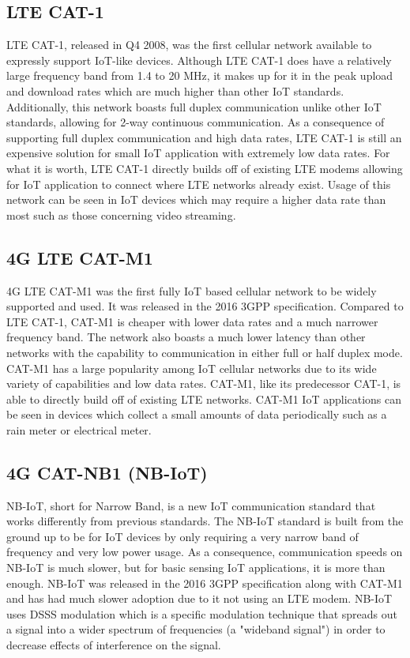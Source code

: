 \documentclass[draftclsnofoot,onecolumn, 10pt, compsoc]{IEEEtran}
\begin{document}
	\subsection{LTE CAT-1}
	LTE CAT-1, released in Q4 2008, was the first cellular network available to expressly support IoT-like devices. Although LTE CAT-1 does have a relatively large frequency band from 1.4 to 20 MHz, it makes up for it in the peak upload and download rates which are much higher than other IoT standards. Additionally, this network boasts full duplex communication unlike other IoT standards, allowing for 2-way continuous communication. As a consequence of supporting full duplex communication and high data rates, LTE CAT-1 is still an expensive solution for small IoT application with extremely low data rates. For what it is worth, LTE CAT-1 directly builds off of existing LTE modems allowing for IoT application to connect where LTE networks already exist. Usage of this network can be seen in IoT devices which may require a higher data rate than most such as those concerning video streaming.
	
	\subsection{4G LTE CAT-M1}
	4G LTE CAT-M1 was the first fully IoT based cellular network to be widely supported and used. It was released in the 2016 3GPP specification. Compared to LTE CAT-1, CAT-M1 is cheaper with lower data rates and a much narrower frequency band. The network also boasts a much lower latency than other networks with the capability to communication in either full or half duplex mode. CAT-M1 has a large popularity among IoT cellular networks due to its wide variety of capabilities and low data rates. CAT-M1, like its predecessor CAT-1, is able to directly build off of existing LTE networks. CAT-M1 IoT applications can be seen in devices which collect a small amounts of data periodically such as a rain meter or electrical meter. 
	
	\subsection{4G CAT-NB1 (NB-IoT)}
	NB-IoT, short for Narrow Band, is a new IoT communication standard that works differently from previous standards. The NB-IoT standard is built from the ground up to be for IoT devices by only requiring a very narrow band of frequency and very low power usage. As a consequence, communication speeds on NB-IoT is much slower, but for basic sensing IoT applications, it is more than enough. NB-IoT was released in the 2016 3GPP specification along with CAT-M1 and has had much slower adoption due to it not using an LTE modem. NB-IoT uses DSSS modulation which is a specific modulation technique that spreads out a signal into a wider spectrum of frequencies (a "wideband signal") in order to decrease effects of interference on the signal.
	
\end{document}
